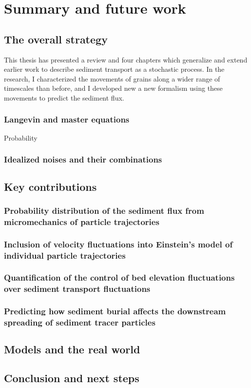 
\chapter{Summary and future work}
\label{ch:conc}
\section{The overall strategy}

This thesis has presented a review and four chapters which generalize and extend earlier work to describe sediment transport as a stochastic process. In the research, I characterized the movements of grains along a wider range of timescales than before, and I developed new a new formalism using these movements to predict the sediment flux.

\subsection{Langevin and master equations}

Probability 


\subsection{Idealized noises and their combinations}


\section{Key contributions}

\subsection{Probability distribution of the sediment flux from micromechanics of particle trajectories}

\subsection{Inclusion of velocity fluctuations into Einstein's model of individual particle trajectories}


\subsection{Quantification of the control of bed elevation fluctuations over sediment transport fluctuations}


\subsection{Predicting how sediment burial affects the downstream spreading of sediment tracer particles}


\section{Models and the real world}

\section{Conclusion and next steps}